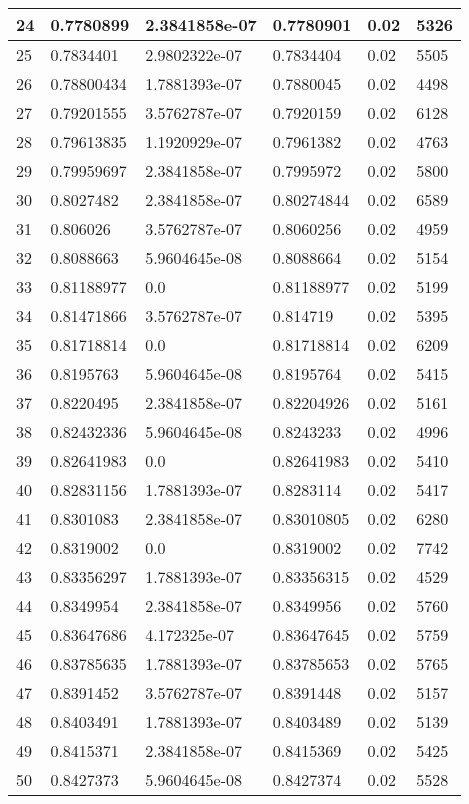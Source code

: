 \begin{longtable}{|l|l|l|l|l|l|}
24 & 0.7780899 & 2.3841858e-07 & 0.7780901 & 0.02 & 5326 \\ \hline 
25 & 0.7834401 & 2.9802322e-07 & 0.7834404 & 0.02 & 5505 \\ \hline 
26 & 0.78800434 & 1.7881393e-07 & 0.7880045 & 0.02 & 4498 \\ \hline 
27 & 0.79201555 & 3.5762787e-07 & 0.7920159 & 0.02 & 6128 \\ \hline 
28 & 0.79613835 & 1.1920929e-07 & 0.7961382 & 0.02 & 4763 \\ \hline 
29 & 0.79959697 & 2.3841858e-07 & 0.7995972 & 0.02 & 5800 \\ \hline 
30 & 0.8027482 & 2.3841858e-07 & 0.80274844 & 0.02 & 6589 \\ \hline 
31 & 0.806026 & 3.5762787e-07 & 0.8060256 & 0.02 & 4959 \\ \hline 
32 & 0.8088663 & 5.9604645e-08 & 0.8088664 & 0.02 & 5154 \\ \hline 
33 & 0.81188977 & 0.0 & 0.81188977 & 0.02 & 5199 \\ \hline 
34 & 0.81471866 & 3.5762787e-07 & 0.814719 & 0.02 & 5395 \\ \hline 
35 & 0.81718814 & 0.0 & 0.81718814 & 0.02 & 6209 \\ \hline 
36 & 0.8195763 & 5.9604645e-08 & 0.8195764 & 0.02 & 5415 \\ \hline 
37 & 0.8220495 & 2.3841858e-07 & 0.82204926 & 0.02 & 5161 \\ \hline 
38 & 0.82432336 & 5.9604645e-08 & 0.8243233 & 0.02 & 4996 \\ \hline 
39 & 0.82641983 & 0.0 & 0.82641983 & 0.02 & 5410 \\ \hline 
40 & 0.82831156 & 1.7881393e-07 & 0.8283114 & 0.02 & 5417 \\ \hline 
41 & 0.8301083 & 2.3841858e-07 & 0.83010805 & 0.02 & 6280 \\ \hline 
42 & 0.8319002 & 0.0 & 0.8319002 & 0.02 & 7742 \\ \hline 
43 & 0.83356297 & 1.7881393e-07 & 0.83356315 & 0.02 & 4529 \\ \hline 
44 & 0.8349954 & 2.3841858e-07 & 0.8349956 & 0.02 & 5760 \\ \hline 
45 & 0.83647686 & 4.172325e-07 & 0.83647645 & 0.02 & 5759 \\ \hline 
46 & 0.83785635 & 1.7881393e-07 & 0.83785653 & 0.02 & 5765 \\ \hline 
47 & 0.8391452 & 3.5762787e-07 & 0.8391448 & 0.02 & 5157 \\ \hline 
48 & 0.8403491 & 1.7881393e-07 & 0.8403489 & 0.02 & 5139 \\ \hline 
49 & 0.8415371 & 2.3841858e-07 & 0.8415369 & 0.02 & 5425 \\ \hline 
50 & 0.8427373 & 5.9604645e-08 & 0.8427374 & 0.02 & 5528 \\ \hline 
\end{longtable}